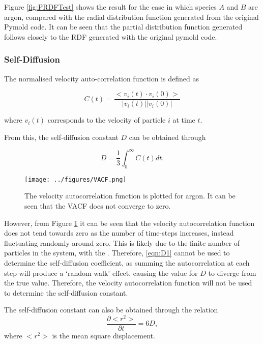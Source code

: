 \documentclass{article}
\begin{document}
Figure \ref{fig:PRDFTest} shows the result for the case in which species $A$ and $B$ are argon, compared with the radial distribution function generated from the original Pymold code. It can be seen that the partial distribution function generated follows closely to the RDF generated with the original pymold code.

\subsubsection{Self-Diffusion}

The normalised  velocity auto-correlation function is defined as 

\begin{equation}
C(t) = \frac{<v_i(t) \cdot v_i (0)>}{|v_i(t)||v_i(0)|}
\end{equation}

where $v_i(t)$ corresponds to the velocity of particle $i$ at time $t$. 

From this, the self-diffusion constant $D$ can be obtained through

\begin{equation}
\label{eqn:D1}
D = \frac{1}{3} \int_{0}^{\infty}C(t)dt.
\end{equation}

\begin{figure}[h]
    \centering
    \texttt{[image: ../figures/VACF.png]}
    \caption{The velocity autocorrelation function is plotted for argon. It can be seen that the VACF does not converge to zero. \label{fig:VACFTest}}
\end{figure}

However, from Figure \ref{fig:VACFTest} it can be seen that the velocity autocorrelation function does not tend towards zero as the number of time-steps increases, instead fluctuating randomly around zero. This is likely due to the finite number of particles in the system, with the . Therefore, \ref{eqn:D1} cannot be used to determine the self-diffusion coefficient, as summing the autocorrelation at each step will produce a `random walk' effect, causing the value for $D$ to diverge from the true value. Therefore, the velocity autocorrelation function will not be used to determine the self-diffusion constant.

The self-diffusion constant can also be obtained through the relation 
\begin{equation}
\label{eqn:D2}
\frac{\partial <r^2>}{\partial t} = 6D,
\end{equation}
where $<r^2>$ is the mean square displacement.
\end{document}
